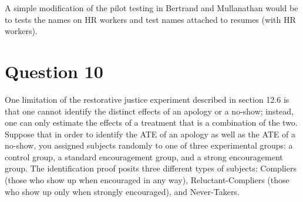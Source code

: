\documentclass[11pt,notitlepage]{article}\usepackage[]{graphicx}\usepackage[]{color}
\begin{document}
\begin{enumerate}[a)]
A simple modification of the pilot testing in Bertrand and Mullanathan would be to tests the names on HR workers and test names attached to resumes (with HR workers). 

\end{enumerate}


\section*{Question 10}
One limitation of the restorative justice experiment described in section 12.6 is that one cannot identify the distinct effects of an apology or a no-show; instead, one can only estimate the effects of a treatment that is a combination of the two. Suppose that in order to identify the ATE of an apology as well as the ATE of a no-show, you assigned subjects randomly to one of three experimental groups: a control group, a standard encouragement group, and a strong encouragement group. The identification proof posits three different types of subjects: Compliers (those who show up when encouraged in any way), Reluctant-Compliers (those who show up only when strongly encouraged), and Never-Takers.
\end{document}

